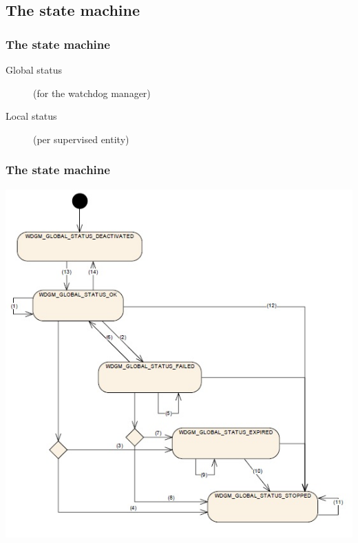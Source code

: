 \documentclass{beamer}
\begin{document}

\subsection{The state machine}

\begin{frame}
  \frametitle{The state machine}
  \begin{description}
    \item[Global status] (for the watchdog manager)
    \item[Local status] (per supervised entity)
  \end{description}


\end{frame}

\begin{frame}
  \frametitle{The state machine}
  \includegraphics[keepaspectratio, width=0.7\linewidth]{globalstatuses}
\end{frame}
\end{document}
